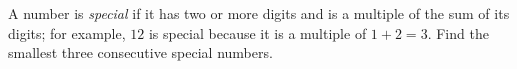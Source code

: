 A number is \emph{special} if it has two or more digits and is a multiple of the sum of its digits; for example, $12$ is special because it is a multiple of $1+2=3$. Find the smallest three consecutive special numbers.

